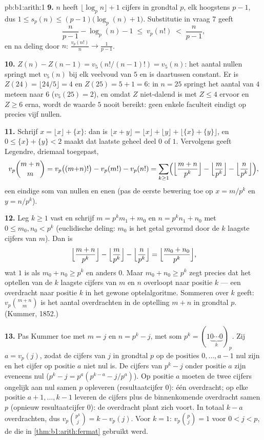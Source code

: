 \begin{solution}{pb:b1:arith:1}
\textbf{9.} $n$ heeft $\lfloor \log_p n \rfloor + 1$ cijfers in grondtal
$p$, elk hoogstens $p - 1$, dus $1 \leq s_p(n) \leq
(p-1)\bigl(\log_p(n) + 1\bigr)$. Substitutie in vraag 7 geeft
\[
\frac n{p-1} - \log_p(n) - 1 \;\leq\; v_p(n!) \;<\; \frac n{p-1},
\]
en na deling door $n$: $\frac{v_p(n!)}n \to \frac1{p-1}$.

\textbf{10.} $Z(n) - Z(n-1) = v_5(n!/(n-1)!) = v_5(n)$: het aantal nullen
springt met $v_5(n)$ bij elk veelvoud van $5$ en is daartussen constant.
Er is $Z(24) = \lfloor24/5\rfloor = 4$ en $Z(25) = 5 + 1 = 6$: in $n =
25$ springt het aantal van $4$ meteen naar $6$ ($v_5(25) = 2$), en omdat
$Z$ niet-dalend is met $Z \leq 4$ ervoor en $Z \geq 6$ erna, wordt de
waarde $5$ nooit bereikt: geen enkele faculteit eindigt op precies vijf
nullen.

\textbf{11.} Schrijf $x = \lfloor x\rfloor + \{x\}$: dan is $\lfloor x +
y\rfloor = \lfloor x\rfloor + \lfloor y\rfloor + \lfloor \{x\} +
\{y\}\rfloor$, en $0 \leq \{x\} + \{y\} < 2$ maakt dat laatste geheel deel
$0$ of $1$. Vervolgens geeft Legendre, driemaal toegepast,
\[
v_p\binom{m+n}m = v_p\bigl((m{+}n)!\bigr) - v_p(m!) - v_p(n!)
= \sum_{k\geq1}\Bigl(
\Bigl\lfloor\frac{m+n}{p^k}\Bigr\rfloor
- \Bigl\lfloor\frac{m}{p^k}\Bigr\rfloor
- \Bigl\lfloor\frac{n}{p^k}\Bigr\rfloor\Bigr),
\]
een eindige som van nullen en enen (pas de eerste bewering toe op $x =
m/p^k$ en $y = n/p^k$).

\textbf{12.} Leg $k \geq 1$ vast en schrijf $m = p^km_1 + m_0$ en $n =
p^kn_1 + n_0$ met $0 \leq m_0, n_0 < p^k$ (euclidische deling: $m_0$ is
het getal gevormd door de $k$ laagste cijfers van $m$). Dan is
\[
\Bigl\lfloor\frac{m+n}{p^k}\Bigr\rfloor
- \Bigl\lfloor\frac m{p^k}\Bigr\rfloor
- \Bigl\lfloor\frac n{p^k}\Bigr\rfloor
= \Bigl\lfloor\frac{m_0 + n_0}{p^k}\Bigr\rfloor ,
\]
wat $1$ is als $m_0 + n_0 \geq p^k$ en anders $0$. Maar $m_0 + n_0 \geq
p^k$ zegt precies dat het optellen van de $k$ laagste cijfers van $m$ en
$n$ overloopt naar positie $k$ --- een overdracht naar positie $k$ in het
gewone optelalgoritme. Sommeren over $k$ geeft: $v_p\binom{m+n}m$ is het
aantal overdrachten in de optelling $m + n$ in grondtal $p$. (Kummer,
1852.)

\textbf{13.} Pas Kummer toe met $m = j$ en $n = p^k - j$, met som $p^k =
(1\underbrace{0\cdots0}_{k})_p$. Zij $a = v_p(j)$, zodat de cijfers van
$j$ in grondtal $p$ op de posities $0, \dots, a-1$ nul zijn en het cijfer
op positie $a$ niet nul is. De cijfers van $p^k - j$ onder positie $a$
zijn eveneens nul ($p^k - j = p^a(p^{k-a} - j/p^a)$). Op positie $a$
moeten de twee cijfers ongelijk aan nul samen $p$ opleveren
(resultaatcijfer $0$): één overdracht; op elke positie $a+1, \dots, k-1$
leveren de cijfers plus de binnenkomende overdracht samen $p$ (opnieuw
resultaatcijfer $0$): de overdracht plant zich voort. In totaal $k - a$
overdrachten, dus $v_p\binom{p^k}j = k - v_p(j)$. Voor $k = 1$:
$v_p\binom pj = 1$ voor $0 < j < p$, de  die in
\cref{thm:b1:arith:fermat} gebruikt werd.


\end{solution}
